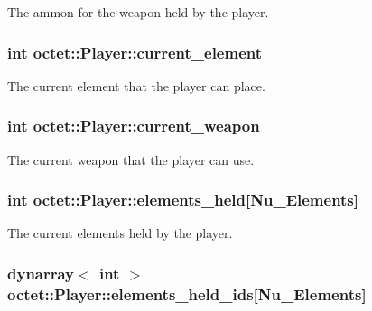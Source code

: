 The ammon for the weapon held by the player. 

\hypertarget{structoctet_1_1_player_a2ec6d4e522ec40035a3ab5a3389147fe}{
\subsubsection[{current\+\_\+element}]{\setlength{\rightskip}{0pt plus 5cm}int octet\+::\+Player\+::current\+\_\+element}}\label{structoctet_1_1_player_a2ec6d4e522ec40035a3ab5a3389147fe}


The current element that the player can place. 

\hypertarget{structoctet_1_1_player_a20425ffb04a95dd2403edf613aa3959a}{
\subsubsection[{current\+\_\+weapon}]{\setlength{\rightskip}{0pt plus 5cm}int octet\+::\+Player\+::current\+\_\+weapon}}\label{structoctet_1_1_player_a20425ffb04a95dd2403edf613aa3959a}


The current weapon that the player can use. 

\hypertarget{structoctet_1_1_player_a52efa1d95f5bdf41f0fe427339b55801}{
\subsubsection[{elements\+\_\+held}]{\setlength{\rightskip}{0pt plus 5cm}int octet\+::\+Player\+::elements\+\_\+held\mbox{[}{\bf Nu\+\_\+\+Elements}\mbox{]}}}\label{structoctet_1_1_player_a52efa1d95f5bdf41f0fe427339b55801}


The current elements held by the player. 

\hypertarget{structoctet_1_1_player_a7d368ab73cce8c40a836e0b14a858c6c}{
\subsubsection[{elements\+\_\+held\+\_\+ids}]{\setlength{\rightskip}{0pt plus 5cm}dynarray$<$ int $>$ octet\+::\+Player\+::elements\+\_\+held\+\_\+ids\mbox{[}{\bf Nu\+\_\+\+Elements}\mbox{]}}}\label{structoctet_1_1_player_a7d368ab73cce8c40a836e0b14a858c6c}


